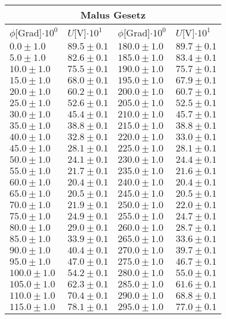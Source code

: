\documentclass{article}
\begin{document}
\begin{tabular}{|p{3cm}|p{3cm}||p{3cm}|p{3cm}|}
\hline
\multicolumn{4}{|c|}{Malus Gesetz}\\
\hline
$\phi$[Grad]$\cdot 10^{0}$&$U$[V]$\cdot 10^{1}$&$\phi$[Grad]$\cdot 10^{0}$&$U$[V]$\cdot 10^{1}$\\
\hline
$0.0\pm1.0$&$89.5\pm 0.1$&$180.0\pm1.0$&$89.7\pm 0.1$\\
$5.0\pm1.0$&$82.6\pm 0.1$&$185.0\pm1.0$&$83.4\pm 0.1$\\
$10.0\pm1.0$&$75.5\pm 0.1$&$190.0\pm1.0$&$75.7\pm 0.1$\\
$15.0\pm1.0$&$68.0\pm 0.1$&$195.0\pm1.0$&$67.9\pm 0.1$\\
$20.0\pm1.0$&$60.2\pm 0.1$&$200.0\pm1.0$&$60.7\pm 0.1$\\
$25.0\pm1.0$&$52.6\pm 0.1$&$205.0\pm1.0$&$52.5\pm 0.1$\\
$30.0\pm1.0$&$45.4\pm 0.1$&$210.0\pm1.0$&$45.7\pm 0.1$\\
$35.0\pm1.0$&$38.8\pm 0.1$&$215.0\pm1.0$&$38.8\pm 0.1$\\
$40.0\pm1.0$&$32.8\pm 0.1$&$220.0\pm1.0$&$33.0\pm 0.1$\\
$45.0\pm1.0$&$28.1\pm 0.1$&$225.0\pm1.0$&$28.1\pm 0.1$\\
$50.0\pm1.0$&$24.1\pm 0.1$&$230.0\pm1.0$&$24.4\pm 0.1$\\
$55.0\pm1.0$&$21.7\pm 0.1$&$235.0\pm1.0$&$21.6\pm 0.1$\\
$60.0\pm1.0$&$20.4\pm 0.1$&$240.0\pm1.0$&$20.4\pm 0.1$\\
$65.0\pm1.0$&$20.5\pm 0.1$&$245.0\pm1.0$&$20.5\pm 0.1$\\
$70.0\pm1.0$&$21.9\pm 0.1$&$250.0\pm1.0$&$22.0\pm 0.1$\\
$75.0\pm1.0$&$24.9\pm 0.1$&$255.0\pm1.0$&$24.7\pm 0.1$\\
$80.0\pm1.0$&$29.0\pm 0.1$&$260.0\pm1.0$&$28.7\pm 0.1$\\
$85.0\pm1.0$&$33.9\pm 0.1$&$265.0\pm1.0$&$33.6\pm 0.1$\\
$90.0\pm1.0$&$40.4\pm 0.1$&$270.0\pm1.0$&$39.7\pm 0.1$\\
$95.0\pm1.0$&$47.0\pm 0.1$&$275.0\pm1.0$&$46.7\pm 0.1$\\
$100.0\pm1.0$&$54.2\pm 0.1$&$280.0\pm1.0$&$55.0\pm 0.1$\\
$105.0\pm1.0$&$62.3\pm 0.1$&$285.0\pm1.0$&$61.6\pm 0.1$\\
$110.0\pm1.0$&$70.4\pm 0.1$&$290.0\pm1.0$&$68.8\pm 0.1$\\
$115.0\pm1.0$&$78.1\pm 0.1$&$295.0\pm1.0$&$77.0\pm 0.1$\\

\end{tabular}
\end{document}

